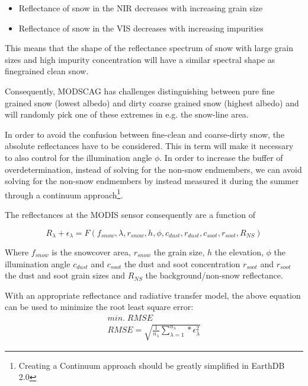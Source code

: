 \documentclass[letterpaper, parskip=half]{scrartcl}
\begin{document}
\begin{itemize}
 \item Reflectance of snow in the NIR decreases with increasing grain size
 \item Reflectance of snow in the VIS decreases with increasing impurities
\end{itemize}

This means that the shape of the reflectance spectrum of 
snow with large grain sizes and high impurity concentration will have a similar spectral shape as finegrained clean snow.

Consequently, \gls{MODSCAG} has challenges distinguishing between pure fine grained snow (lowest albedo) and dirty coarse grained snow (highest albedo) and will randomly pick one of these extremes in e.g. the snow-line area.

In order to avoid the confusion between fine-clean and coarse-dirty snow, the absolute reflectances have to be considered.
This in term will make it necessary to also control for the illumination angle $\phi$.
In order to increase the buffer of overdetermination, instead of solving for the non-snow endmembers, we can avoid solving for the non-snow endmembers by instead measured it during the summer through a continuum approach\footnote{Creating a Continuum approach should be greatly simplified in EarthDB 2.0}.

The reflectances at the MODIS sensor consequently are a function of

\begin{equation}
    R_{\lambda} + \epsilon_{\lambda} = F(f_{snow}, \lambda, r_{snow}, h, \phi, c_{dust}, r_{dust}, c_{soot}, r_{soot}, R_{NS})
\end{equation}

Where $f_{snow}$ is the snowcover area, 
$r_{snow}$ the grain size, 
$h$ the elevation,  
$\phi$ the illumination angle 
$c_{dust}$ and $c_{soot}$ the dust and soot concentration
$r_{soot}$ and $r_{soot}$ the dust and soot grain sizes
and $R_{NS}$ the background/non-snow reflectance.

With an appropriate reflectance and radiative transfer model, the above equation can be used to minimize the root least square error:
\begin{equation}
\begin{split}
min.\; RMSE \\
 RMSE = \sqrt{ \frac{1}{n_{\lambda}} \sum_{\lambda=1}^{n_\lambda} * \epsilon_{\lambda}^2}
 \end{split}
\end{equation}
\end{document}
